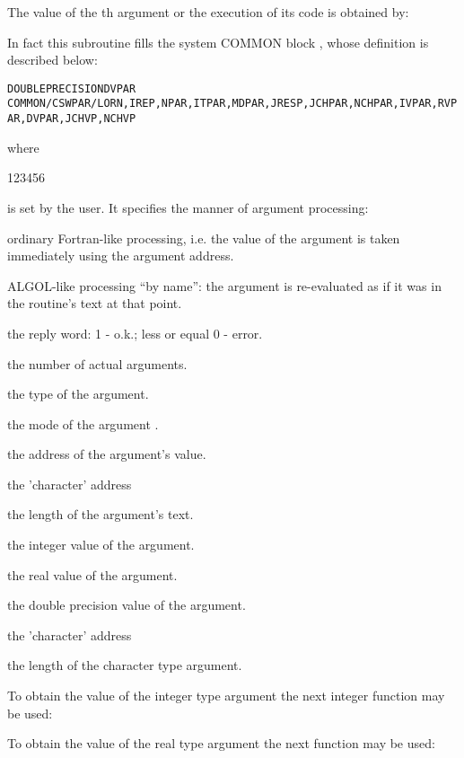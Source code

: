The value of the th argument or the execution of its code
is obtained by:

 
In fact this subroutine fills the system COMMON block ,
whose definition is described below:

\begin{alltt}
 DOUBLE PRECISION DVPAR
 COMMON/CSWPAR/LORN,IREP,NPAR,ITPAR,MDPAR,JRESP,JCHPAR,NCHPAR,IVPAR,RVPAR,DVPAR,JCHVP,NCHVP
\end{alltt}
where
\begin{DLtt}{123456}
\item[LORN]   is set by the user. It specifies  the manner  of argument
      processing:
\begin{DLtt}{1}
\item[0] ordinary Fortran-like processing, i.e. the value
     of the argument is taken immediately using the argument
     address.
\item[1] ALGOL-like processing ``by name'': the argument
     is re-evaluated as if it was in the routine's
     text at that point.
\end{DLtt}
\item[IREP]    the reply word:
        1 - o.k.;  less or equal 0 - error.
\item[NPAR]    the number of actual arguments.
\item[ITPAR]   the type of the argument.
\item[MDPAR]   the mode of the argument .
\item[JRESP]   the address of the argument's value.
\item[JCHPAR]  the 'character' address
\item[NCHPAR]  the length of the argument's text.
\item[IVPAR]   the integer value of the argument.
\item[RVPAR]   the real value of the argument.
\item[DVPAR]   the double precision value of the argument.
\item[JCHVP]   the 'character' address
\item[NCHVP]   the length of the character type argument.
\end{DLtt}
To obtain the value of the integer type argument the
next integer function may be used:


To obtain the value of the real type argument the
next function may be used:

